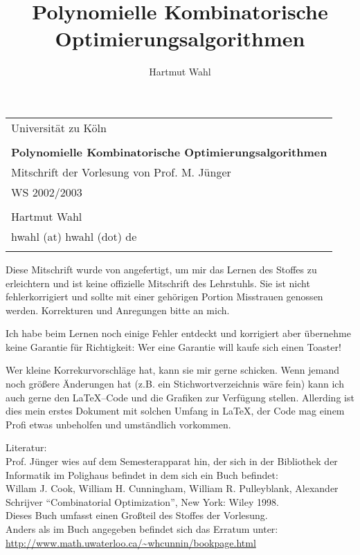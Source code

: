 \documentclass[12pt,titlepage,a4paper] {book}
\title{Polynomielle Kombinatorische Optimierungsalgorithmen}
\author{Hartmut Wahl}
\begin{document}
\begin{titlepage}
\ifpdf
{}%
\fi
\begin{singlespacing}
\begin{tabular}{l}
{\Large Universität zu Köln}\\

\vspace{9cm}\\


{\bf \large Polynomielle Kombinatorische Optimierungsalgorithmen }\\
Mitschrift der Vorlesung von Prof. M. Jünger\\
WS 2002/2003
\\
\vspace{9cm}
\\
Hartmut Wahl\\
hwahl (at) hwahl (dot) de\\
\vspace{7mm}\\

\end{tabular}
\end{singlespacing}
\end{titlepage}


Diese Mitschrift wurde von angefertigt, um mir das Lernen des Stoffes zu
erleichtern und ist keine offizielle Mitschrift des Lehrstuhls. Sie ist
nicht fehlerkorrigiert und sollte mit einer gehörigen Portion Misstrauen
genossen werden. Korrekturen und Anregungen bitte an mich.

Ich habe beim Lernen noch einige Fehler entdeckt und korrigiert aber
übernehme keine Garantie für Richtigkeit: Wer eine Garantie will kaufe
sich einen Toaster!

Wer kleine Korrekurvorschläge hat, kann sie mir gerne schicken. Wenn jemand
noch größere Änderungen hat (z.B. ein Stichwortverzeichnis wäre fein) kann
ich auch gerne den \LaTeX--Code und die Grafiken zur Verfügung stellen.
Allerding ist dies mein erstes Dokument mit solchen Umfang in \LaTeX, der
Code mag einem Profi etwas unbeholfen und umständlich vorkommen.

Literatur:\\
Prof. Jünger wies auf dem Semesterapparat hin, der sich in der Bibliothek
der Informatik im Polighaus befindet in dem sich ein Buch befindet:\\
{ Willam J. Cook, William H. Cunningham, William R. Pulleyblank,
Alexander \mbox{Schrijver}} "`Combinatorial Optimization"', New York: Wiley 1998.\\
Dieses Buch umfasst einen Großteil des Stoffes der Vorlesung.\\ Anders als
im Buch angegeben befindet sich das Erratum unter:\\
\url{http://www.math.uwaterloo.ca/~whcunnin/bookpage.html}
\end{document}

